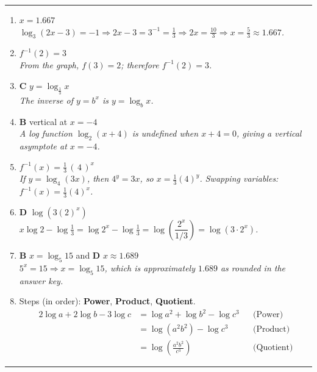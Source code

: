 \documentclass[11pt]{article}
\begin{document}
\vspace{6pt}
\hrule
\vspace{10pt}

\begin{enumerate}[leftmargin=2.1em, itemsep=7pt]

\item $x = \boxed{1.667}$ \\
\textit{$\log_3(2x - 3) = -1 \Rightarrow 2x - 3 = 3^{-1} = \tfrac{1}{3} \Rightarrow 2x = \tfrac{10}{3} \Rightarrow x = \tfrac{5}{3} \approx 1.667$.}

\item $f^{-1}(2) = \boxed{3}$ \\
\textit{From the graph, $f(3) = 2$; therefore $f^{-1}(2) = 3$.}

\item \textbf{C} \quad $y = \log_{\frac{1}{3}} x$ \\
\textit{The inverse of $y = b^x$ is $y = \log_b x$.}

\item \textbf{B} \quad vertical at $x = -4$ \\
\textit{A log function $\log_2(x + 4)$ is undefined when $x + 4 = 0$, giving a vertical asymptote at $x = -4$.}

\item $f^{-1}(x) = \boxed{\tfrac{1}{3}} \, (\,\boxed{4}\,)^{x}$ \\
\textit{If $y = \log_4(3x)$, then $4^y = 3x$, so $x = \tfrac{1}{3}(4)^y$. Swapping variables: $f^{-1}(x) = \tfrac{1}{3}(4)^x$.}

\item \textbf{D} \quad $\log(3(2)^x)$ \\
\textit{$x\log 2 - \log\tfrac{1}{3} = \log 2^x - \log \tfrac{1}{3} = \log\!\left(\dfrac{2^x}{1/3}\right) = \log(3 \cdot 2^x)$.}

\item \textbf{B} \; $x = \log_5 15$ \; and \; \textbf{D} \; $x \approx 1.689$ \\
\textit{$5^x = 15 \Rightarrow x = \log_5 15$, which is approximately $1.689$ as rounded in the answer key.}

\item Steps (in order): \textbf{Power}, \textbf{Product}, \textbf{Quotient}.
\begin{align*}
2\log a + 2\log b - 3\log c &= \log a^{2} + \log b^{2} - \log c^{3} &&\text{(Power)}\\
&= \log(a^{2}b^{2}) - \log c^{3} &&\text{(Product)}\\
&= \log\!\left(\frac{a^{2}b^{2}}{c^{3}}\right) &&\text{(Quotient)}
\end{align*}

\end{enumerate}

\vspace{12pt}
\hrule
\vspace{4pt}
\end{document}
